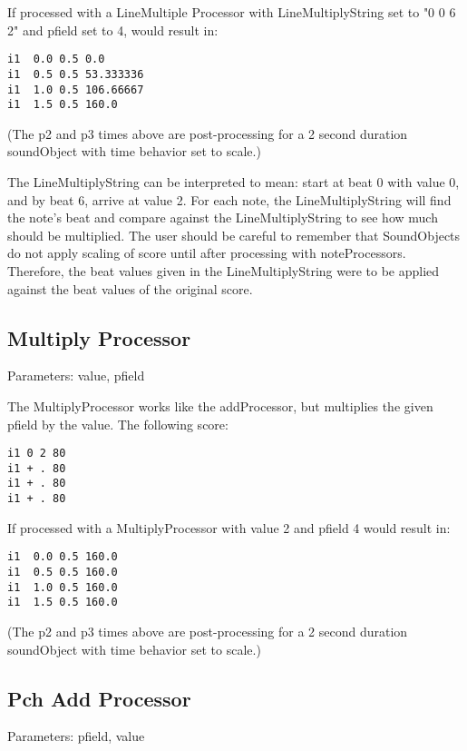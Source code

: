 If processed with a LineMultiple Processor with LineMultiplyString set
to "0 0 6 2" and pfield set to 4, would result in:

\begin{verbatim}
i1  0.0 0.5 0.0
i1  0.5 0.5 53.333336
i1  1.0 0.5 106.66667
i1  1.5 0.5 160.0
\end{verbatim}

(The p2 and p3 times above are post-processing for a 2 second duration
soundObject with time behavior set to scale.)

The LineMultiplyString can be interpreted to mean: start at beat 0 with
value 0, and by beat 6, arrive at value 2. For each note, the
LineMultiplyString will find the note's beat and compare against the
LineMultiplyString to see how much should be multiplied. The user should
be careful to remember that SoundObjects do not apply scaling of score
until after processing with noteProcessors. Therefore, the beat values
given in the LineMultiplyString were to be applied against the beat
values of the original score.


\subsection{Multiply Processor}\label{multiplyProcessor}

Parameters: value, pfield

The MultiplyProcessor works like the addProcessor, but multiplies the
given pfield by the value. The following score:

\begin{verbatim}
i1 0 2 80
i1 + . 80
i1 + . 80
i1 + . 80
\end{verbatim}

If processed with a MultiplyProcessor with value 2 and pfield 4 would
result in:

\begin{verbatim}
i1  0.0 0.5 160.0
i1  0.5 0.5 160.0
i1  1.0 0.5 160.0
i1  1.5 0.5 160.0
\end{verbatim}

(The p2 and p3 times above are post-processing for a 2 second duration
soundObject with time behavior set to scale.)


\subsection{Pch Add Processor}\label{pchAddProcessor}

Parameters: pfield, value

